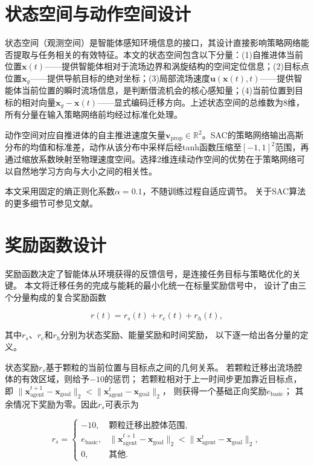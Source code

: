 \section{状态空间与动作空间设计}

状态空间（观测空间）是智能体感知环境信息的接口，其设计直接影响策略网络能否提取与任务相关的有效特征。本文的状态空间包含以下分量：(1)自推进体当前位置$\mathbf{x}(t)$——提供智能体相对于流场边界和涡旋结构的空间定位信息；(2)目标点位置$\mathbf{x}_g$——提供导航目标的绝对坐标；(3)局部流场速度$\mathbf{u}(\mathbf{x}(t), t)$——提供智能体当前位置的瞬时流场信息，是判断借流机会的核心感知量；(4)当前位置到目标的相对向量$\mathbf{x}_g - \mathbf{x}(t)$——显式编码迁移方向。上述状态空间的总维数为8维，所有分量在输入策略网络前均经过标准化处理。

动作空间对应自推进体的自主推进速度矢量$\mathbf{v}_{\text{prop}} \in \mathbb{R}^2$。SAC的策略网络输出高斯分布的均值和标准差，动作从该分布中采样后经tanh函数压缩至$[-1, 1]^2$范围，再通过缩放系数映射至物理速度空间。选择2维连续动作空间的优势在于策略网络可以自然地学习方向与大小之间的相关性。

本文采用固定的熵正则化系数$\alpha = 0.1$，不随训练过程自适应调节。
关于SAC算法的更多细节可参见文献\cite{haarnojaSoftActorcriticOffpolicy2018}。

\section{奖励函数设计}

奖励函数决定了智能体从环境获得的反馈信号，是连接任务目标与策略优化的关键。
本文将迁移任务的完成与能耗的最小化统一在标量奖励信号中，
设计了由三个分量构成的复合奖励函数

\begin{equation}
    r(t) = r_s(t) + r_e(t) + r_h(t),
    \label{eq:reward_total}
\end{equation}

其中$r_s$、$r_e$和$r_h$分别为状态奖励、能量奖励和时间奖励，
以下逐一给出各分量的定义。

状态奖励$r_s$基于颗粒的当前位置与目标点之间的几何关系。
若颗粒迁移出流场腔体的有效区域，则给予$-10$的惩罚；
若颗粒相对于上一时间步更加靠近目标点，即
$\|\mathbf{x}_{\text{agent}}^{t+1} - \mathbf{x}_{\text{goal}}\|_2 <
\|\mathbf{x}_{\text{agent}}^{t} - \mathbf{x}_{\text{goal}}\|_2$，
则获得一个基础正向奖励$e_{\text{basic}}$；
其余情况下奖励为零。因此$r_s$可表示为

\begin{equation}
    r_s = \begin{cases}
        -10, & \text{颗粒迁移出腔体范围},\\
        e_{\text{basic}}, &
        \|\mathbf{x}_{\text{agent}}^{t+1} - \mathbf{x}_{\text{goal}}\|_2 <
        \|\mathbf{x}_{\text{agent}}^{t} - \mathbf{x}_{\text{goal}}\|_2,\\
        0, & \text{其他}.
    \end{cases}
    \label{eq:state_reward}
\end{equation}

